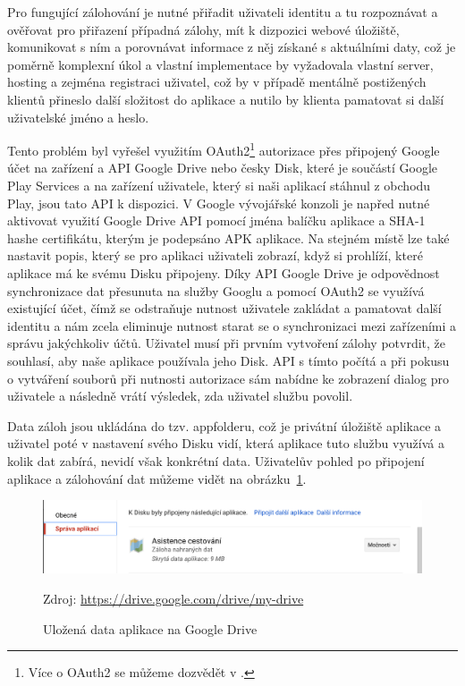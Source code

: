\documentclass{article}
\begin{document}
Pro fungující zálohování je nutné přiřadit uživateli identitu a tu rozpoznávat a ověřovat pro přiřazení případná zálohy,
mít k dizpozici webové úložiště, komunikovat s ním a porovnávat informace z něj získané s aktuálními daty,
což je poměrně komplexní úkol a vlastní implementace by
vyžadovala vlastní server, hosting a zejména registraci uživatel, což by v případě mentálně postižených klientů
přineslo další složitost do aplikace a nutilo by klienta pamatovat si další uživatelské jméno a heslo.

Tento problém byl vyřešel využitím OAuth2\footnote{Více o OAuth2 se můžeme dozvědět v \cite{oauth2}.}
autorizace přes připojený Google účet na zařízení a API Google Drive nebo česky Disk,
 které je součástí Google Play Services a na zařízení uživatele, který si naši aplikací stáhnul z obchodu Play,
 jsou tato API k dispozici.
V Google vývojářské konzoli je napřed nutné aktivovat využití Google Drive API pomocí jména balíčku aplikace a SHA-1 hashe
certifikátu, kterým je podepsáno APK aplikace. Na stejném místě lze také nastavit popis, který se pro aplikaci
uživateli zobrazí, když si prohlíží, které aplikace má ke svému Disku připojeny.
Díky API Google Drive je odpovědnost synchronizace dat přesunuta na služby Googlu a pomocí
OAuth2 se využívá existující účet, čímž se odstraňuje nutnost uživatele zakládat a pamatovat
 další identitu a nám zcela eliminuje nutnost starat se o synchronizaci mezi zařízeními a správu jakýchkoliv účtů.
 Uživatel musí při prvním vytvoření zálohy potvrdit, že souhlasí, aby naše aplikace používala jeho Disk.
 API s tímto počítá a při pokusu o vytváření souborů při nutnosti autorizace sám nabídne ke zobrazení
 dialog pro uživatele a následně vrátí výsledek, zda uživatel službu povolil.

 Data záloh jsou ukládána do tzv. appfolderu\cite{driveappfolder}, což je privátní úložiště aplikace
 a uživatel poté v nastavení svého Disku vidí,
  která aplikace tuto službu využívá a kolik dat zabírá, nevidí však konkrétní data.
  Uživatelův pohled po připojení aplikace a zálohování dat můžeme vidět na obrázku~\ref{fig:connecteddrive}.

\begin{figure}[H]
        \centering
                \includegraphics[scale=0.3]{img/connectedDrive.png}
        \caption{Uložená data aplikace na Google Drive}
        \label{fig:connecteddrive}
        \centering Zdroj: \url{https://drive.google.com/drive/my-drive}
\end{figure}
\end{document}
